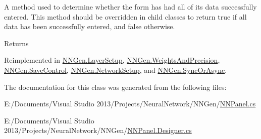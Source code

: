A method used to determine whether the form has had all of its data successfully entered. This method should be overridden in child classes to return true if all data has been successfully entered, and false otherwise. 

\begin{DoxyReturn}{Returns}

\end{DoxyReturn}


Reimplemented in \hyperlink{class_n_n_gen_1_1_layer_setup_a0601d6640ad94c5e34316b60e70f8ede}{N\+N\+Gen.\+Layer\+Setup}, \hyperlink{class_n_n_gen_1_1_weights_and_precision_a55e25affc261256144c0cd9866a63b7a}{N\+N\+Gen.\+Weights\+And\+Precision}, \hyperlink{class_n_n_gen_1_1_save_control_a9802bdb470edb0fbc0fe3d7b04863f6c}{N\+N\+Gen.\+Save\+Control}, \hyperlink{class_n_n_gen_1_1_network_setup_a0fadf5361f2bea6d04cbfe70012c3365}{N\+N\+Gen.\+Network\+Setup}, and \hyperlink{class_n_n_gen_1_1_sync_or_async_a43e1723039a0485fe09f6f374eb48620}{N\+N\+Gen.\+Sync\+Or\+Async}.



The documentation for this class was generated from the following files\+:\begin{DoxyCompactItemize}
\item 
E\+:/\+Documents/\+Visual Studio 2013/\+Projects/\+Neural\+Network/\+N\+N\+Gen/\hyperlink{_n_n_panel_8cs}{N\+N\+Panel.\+cs}\item 
E\+:/\+Documents/\+Visual Studio 2013/\+Projects/\+Neural\+Network/\+N\+N\+Gen/\hyperlink{_n_n_panel_8_designer_8cs}{N\+N\+Panel.\+Designer.\+cs}\end{DoxyCompactItemize}
